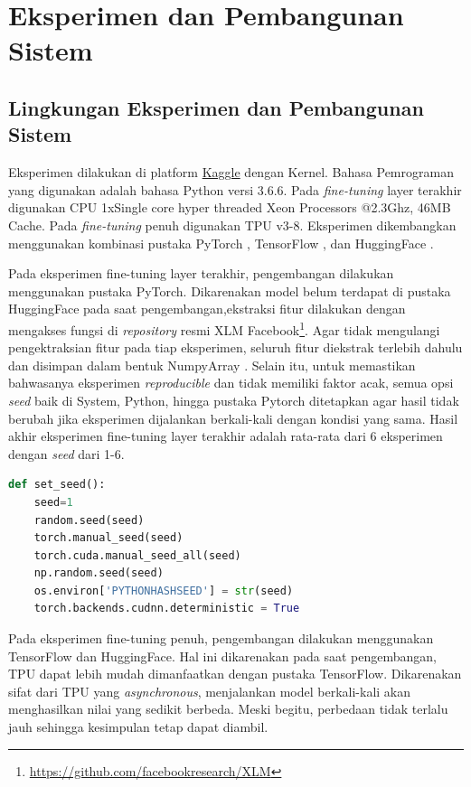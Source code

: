 \chapter{Eksperimen dan Pembangunan Sistem}

\section{Lingkungan Eksperimen dan Pembangunan Sistem}

Eksperimen dilakukan di platform \href{https://www.kaggle.com}{Kaggle} dengan Kernel. Bahasa Pemrograman yang digunakan adalah bahasa Python versi 3.6.6. Pada \textit{fine-tuning} layer terakhir digunakan CPU 1xSingle core hyper threaded Xeon Processors @2.3Ghz, 46MB Cache. Pada \textit{fine-tuning} penuh digunakan TPU v3-8. Eksperimen dikembangkan menggunakan kombinasi pustaka PyTorch \parencite{paszke2017automatic}, TensorFlow \parencite{tensorflow2015}, dan HuggingFace \parencite{HuggingFace}.

Pada eksperimen fine-tuning layer terakhir, pengembangan dilakukan menggunakan pustaka PyTorch. Dikarenakan model belum terdapat di pustaka HuggingFace pada saat pengembangan,ekstraksi fitur dilakukan dengan mengakses fungsi di \textit{repository} resmi XLM Facebook\footnote{\url{https://github.com/facebookresearch/XLM}}. Agar tidak mengulangi pengektraksian fitur pada tiap eksperimen, seluruh fitur diekstrak terlebih dahulu dan disimpan dalam bentuk NumpyArray \parencite{numpy}. Selain itu, untuk memastikan bahwasanya eksperimen \textit{reproducible} dan tidak memiliki faktor acak, semua opsi \textit{seed} baik di System, Python, hingga pustaka Pytorch ditetapkan agar hasil tidak berubah jika eksperimen dijalankan berkali-kali dengan kondisi yang sama. Hasil akhir eksperimen fine-tuning layer terakhir adalah rata-rata dari 6 eksperimen dengan \textit{seed} dari 1-6.

\begin{lstlisting}[language=Python]
def set_seed():
    seed=1
    random.seed(seed)
    torch.manual_seed(seed)
    torch.cuda.manual_seed_all(seed)
    np.random.seed(seed)
    os.environ['PYTHONHASHSEED'] = str(seed)
    torch.backends.cudnn.deterministic = True
\end{lstlisting}

Pada eksperimen fine-tuning penuh, pengembangan dilakukan menggunakan TensorFlow dan HuggingFace. Hal ini dikarenakan pada saat pengembangan, TPU dapat lebih mudah dimanfaatkan dengan pustaka TensorFlow. Dikarenakan sifat dari TPU yang \textit{asynchronous}, menjalankan model berkali-kali akan menghasilkan nilai yang sedikit berbeda. Meski begitu, perbedaan tidak terlalu jauh sehingga kesimpulan tetap dapat diambil.


